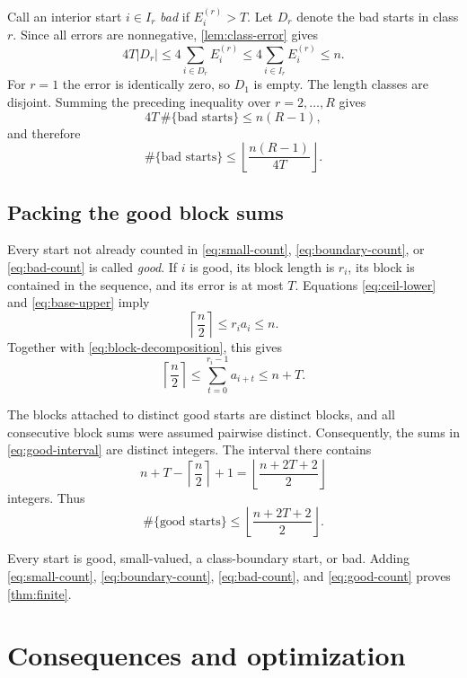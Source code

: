 \documentclass[11pt]{article}
\numberwithin{equation}{section}
\theoremstyle{remark}
\newcommand{\ceil}[1]{\left\lceil #1\right\rceil}
\newcommand{\floor}[1]{\left\lfloor #1\right\rfloor}
\begin{document}
Call an interior start \(i\in I_r\) \emph{bad} if
\(E_i^{(r)}>T\).  Let \(D_r\) denote the bad starts in class \(r\).
Since all errors are nonnegative, \cref{lem:class-error} gives
\[
  4T|D_r|
  \leq4\sum_{i\in D_r}E_i^{(r)}
  \leq4\sum_{i\in I_r}E_i^{(r)}
  \leq n.
\]
For \(r=1\) the error is identically zero, so \(D_1\) is empty.
The length classes are disjoint.  Summing the preceding inequality
over \(r=2,\ldots,R\) gives
\[
  4T\,\#\{\text{bad starts}\}\leq n(R-1),
\]
and therefore
\begin{equation}
  \#\{\text{bad starts}\}
  \leq
  \floor{\frac{n(R-1)}{4T}}.
  \label{eq:bad-count}
\end{equation}

\subsection{Packing the good block sums}

Every start not already counted in \eqref{eq:small-count},
\eqref{eq:boundary-count}, or \eqref{eq:bad-count} is called
\emph{good}.  If \(i\) is good, its block length is \(r_i\), its block
is contained in the sequence, and its error is at most \(T\).
Equations \eqref{eq:ceil-lower} and \eqref{eq:base-upper} imply
\[
  \ceil{\frac n2}\leq r_i a_i\leq n.
\]
Together with \eqref{eq:block-decomposition}, this gives
\begin{equation}
  \ceil{\frac n2}
  \leq \sum_{t=0}^{r_i-1}a_{i+t}
  \leq n+T.
  \label{eq:good-interval}
\end{equation}

The blocks attached to distinct good starts are distinct blocks, and
all consecutive block sums were assumed pairwise distinct.
Consequently, the sums in \eqref{eq:good-interval} are distinct
integers.  The interval there contains
\[
  n+T-\ceil{\frac n2}+1
  =\floor{\frac{n+2T+2}{2}}
\]
integers.  Thus
\begin{equation}
  \#\{\text{good starts}\}
  \leq\floor{\frac{n+2T+2}{2}}.
  \label{eq:good-count}
\end{equation}

Every start is good, small-valued, a class-boundary start, or bad.
Adding \eqref{eq:small-count}, \eqref{eq:boundary-count},
\eqref{eq:bad-count}, and \eqref{eq:good-count} proves
\cref{thm:finite}.

\section{Consequences and optimization}
\end{document}
